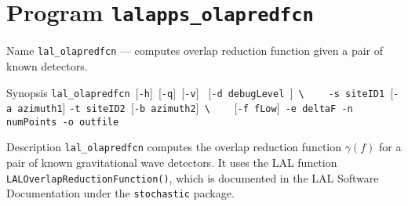 \section{Program \texttt{lalapps\_olapredfcn}}
\label{program:lalapps-olapredfcn}

\begin{entry}

\item[Name]
%
  \verb$lal_olapredfcn$ --- computes overlap reduction function given
  a pair of known detectors.

\item[Synopsis]
%
  \verb$lal_olapredfcn $[\verb$-h$]\verb$ $[\verb$-q$]\verb$ $[\verb$-v$]
  \verb$ $[\verb$-d debugLevel $]\verb+ \+\newline
  \verb$   $
  \verb$-s siteID1 $[\verb$-a azimuth1$]
  \verb$-t siteID2 $[\verb$-b azimuth2$]\verb+ \+\newline
  \verb$   $
  [\verb$-f fLow$]\verb$ -e deltaF$\verb$ -n numPoints$\verb$ -o outfile$
                         
\item[Description]
%
  \verb$lal_olapredfcn$ computes the overlap reduction function
  $\gamma(f)$ for a pair of known gravitational wave detectors.  It
  uses the LAL function \verb$LALOverlapReductionFunction()$, which is
  documented in the LAL Software Documentation under the
  \texttt{stochastic} package.


\end{entry}
